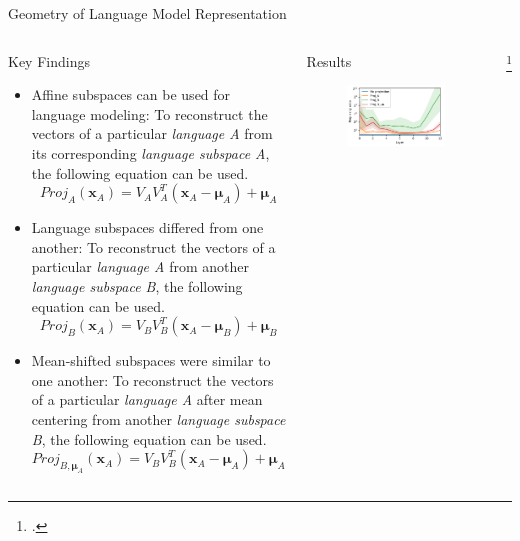 \documentclass{beamer}
\begin{document}
	\begin{frame}{Geometry of Language Model Representation}
		\begin{columns}
			\begin{block}{\scriptsize Key Findings}\scriptsize
				\begin{itemize}
					\item Affine subspaces can be used for language modeling: To reconstruct the vectors of a particular \emph{language A} from its corresponding \emph{language subspace A}, the following equation can be used.
						\begin{equation}\label{E:Proj_A}
							Proj_A(\mathbf{x}_A) = V_A V_A^T (\mathbf{x}_A - \bm{\mu}_A) + \bm{\mu}_A 
						\end{equation}
					
					\item Language subspaces differed from one another: To reconstruct the vectors of a particular \emph{language A} from another \emph{language subspace B}, the following equation can be used.
						\begin{equation}\label{E:Proj_B}
							Proj_B(\mathbf{x}_A) = V_B V_B^T (\mathbf{x}_A - \bm{\mu}_B) + \bm{\mu}_B
						\end{equation}
						
					\item Mean-shifted subspaces were similar to one another: To reconstruct the vectors of a particular \emph{language A} after mean centering from another \emph{language subspace B}, the following equation can be used.
						\begin{equation}\label{E:Proj_B_mu_A}
							Proj_{B, \bm{\mu}_A}(\mathbf{x}_A) = V_B V_B^T (\mathbf{x}_A - \bm{\mu}_A) + \bm{\mu}_A
						\end{equation}
				\end{itemize}
			\end{block}
			\begin{block}{\scriptsize Results\footnotemark}\scriptsize
				\begin{figure}
					\centering
					\includegraphics[width=\textwidth]{proj}
				\end{figure}
			\end{block}\footcitetext{chang2022geometry}
		\end{columns}
	\end{frame}
	
\end{document}
